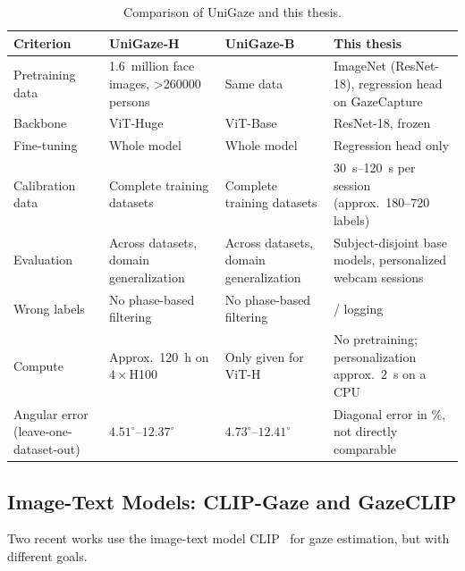 \begin{table}[htbp]
  \centering
  \small
  \caption{Comparison of UniGaze and this thesis.}
  \label{tab:unigaze_vergleich}
  \begin{tabularx}{\textwidth}{L{2.8cm} L{3.2cm} L{2.6cm} Y}
    \toprule
    \textbf{Criterion} & \textbf{UniGaze-H} & \textbf{UniGaze-B} & \textbf{This thesis} \\
    \midrule
    Pretraining data & 1.6~million face images, >\num{260000} persons & Same data & ImageNet (ResNet-18), regression head on GazeCapture \\
    Backbone & ViT-Huge & ViT-Base & ResNet-18, frozen \\
    Fine-tuning & Whole model & Whole model & Regression head only \\
    Calibration data & Complete training datasets & Complete training datasets & \SIrange{30}{120}{\second} per session (approx.\ 180--720 labels) \\
    Evaluation & Across datasets, domain generalization & Across datasets, domain generalization & Subject-disjoint base models, personalized webcam sessions \\
    Wrong labels & No phase-based filtering & No phase-based filtering & / logging \\
    Compute & Approx.\ \SI{120}{\hour} on $4\times$H100 & Only given for ViT-H & No pretraining; personalization approx.\ \SI{2}{\second} on a CPU \\
    Angular error (leave-one-dataset-out) & $4.51^\circ$--$12.37^\circ$ & $4.73^\circ$--$12.41^\circ$ & Diagonal error in \%, not directly comparable \\
    \bottomrule
  \end{tabularx}
\end{table}

\subsection{Image-Text Models: CLIP-Gaze and GazeCLIP}
\label{subsec:clip}
Two recent works use the image-text model CLIP~\cite{radford2021clip} for gaze
estimation, but with different goals.

